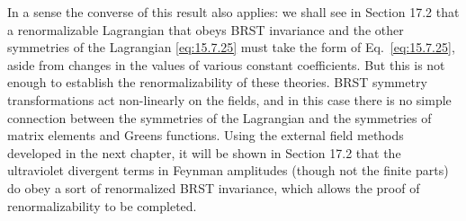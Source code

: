 In a sense the converse of this result also applies: we shall see in Section 17.2 that a renormalizable Lagrangian that obeys BRST invariance and the other symmetries of the Lagrangian \eqref{eq:15.7.25} must take the form of Eq.~\eqref{eq:15.7.25}, aside from changes in the values of various constant coefficients. But this is not enough to establish the renormalizability of these theories. BRST symmetry transformations act non-linearly on the fields, and in this case there is no simple connection between the symmetries of the Lagrangian and the symmetries of matrix elements and Greens functions. Using the external field methods developed in the next chapter, it will be shown in Section 17.2 that the ultraviolet divergent terms in Feynman amplitudes (though not the finite parts) do obey a sort of renormalized BRST invariance, which allows the proof of renormalizability to be completed.

